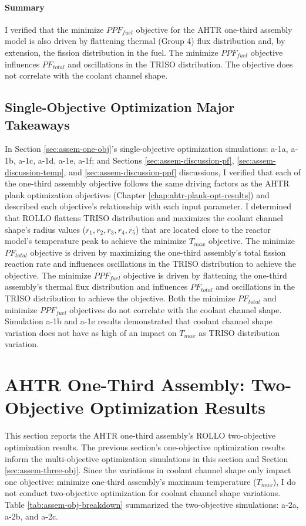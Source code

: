 \paragraph{Summary}
I verified that the minimize $PPF_{fuel}$ objective for the \gls{AHTR} one-third 
assembly model is also driven by flattening thermal (Group 4) flux distribution and,
by extension, the fission distribution in the fuel. 
The minimize $PPF_{fuel}$ objective influences $PF_{total}$ and oscillations in the 
TRISO distribution.
The objective does not correlate with the coolant channel shape.

\subsection{Single-Objective Optimization Major Takeaways}
In Section \ref{sec:assem-one-obj}'s single-objective optimization simulations: 
a-1a, a-1b, a-1c, a-1d, a-1e, a-1f; and Sections \ref{sec:assem-discussion-pf}, 
\ref{sec:assem-discussion-temp}, and \ref{sec:assem-discussion-ppf} discussions,    
I verified that each of the one-third assembly objective follows the same driving 
factors as the \gls{AHTR} plank optimization objectives (Chapter 
\ref{chap:ahtr-plank-opt-results}) and described each objective's relationship with 
each input parameter. 
I determined that \gls{ROLLO} flattens TRISO distribution and maximizes the coolant 
channel shape's radius values ($r_1, r_2, r_3, r_4, r_5$) that are located close to 
the reactor model's temperature peak to achieve the minimize $T_{max}$ objective. 
The minimize $PF_{total}$ objective is driven by maximizing the one-third assembly's 
total fission reaction rate and influences oscillations in the TRISO distribution to 
achieve the objective. 
The minimize $PPF_{fuel}$ objective is driven by flattening the one-third assembly's 
thermal flux distribution and influences $PF_{total}$ and oscillations in the TRISO 
distribution to achieve the objective. 
Both the minimize $PF_{total}$ and minimize $PPF_{fuel}$ objectives do not correlate
with the coolant channel shape. 
Simulation a-1b and a-1e results demonstrated that coolant channel shape variation does 
not have as high of an impact on $T_{max}$ as \gls{TRISO} distribution variation.

\section{AHTR One-Third Assembly: Two-Objective Optimization Results}
\label{sec:assem-two-obj}
This section reports the \gls{AHTR} one-third assembly's \gls{ROLLO} two-objective 
optimization results. 
The previous section's one-objective optimization results inform the multi-objective 
optimization simulations in this section and Section \ref{sec:assem-three-obj}.
Since the variations in coolant channel shape only impact one objective: 
minimize one-third assembly's maximum temperature ($T_{max}$), I do not conduct 
two-objective optimization for coolant channel shape variations.  
Table \ref{tab:assem-obj-breakdown} summarized the two-objective simulations: 
a-2a, a-2b, and a-2c.

